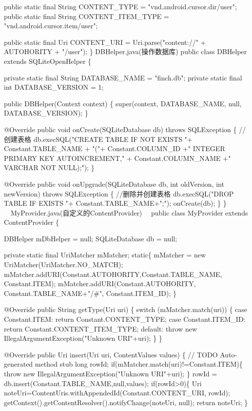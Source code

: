 \documentclass[9pt, b5paper]{article}
\begin{document}
public static final String CONTENT\_TYPE = "vnd.android.cursor.dir/user";  
public static final String CONTENT\_ITEM\_TYPE = "vnd.android.cursor.item/user";  

    public static final Uri CONTENT\_URI = Uri.parse("content://" + AUTOHORITY + "/user");  
\}  
  DBHelper.java(操作数据库)
public class DBHelper extends SQLiteOpenHelper \{  

private static final String DATABASE\_NAME = "finch.db";    
private static final int DATABASE\_VERSION = 1;    

public DBHelper(Context context) \{  
    super(context, DATABASE\_NAME, null, DATABASE\_VERSION);  
\}  

@Override  
public void onCreate(SQLiteDatabase db)  throws SQLException \{  
    //创建表格  
    db.execSQL("CREATE TABLE IF NOT EXISTS "+ Constant.TABLE\_NAME + "("+ Constant.COLUMN\_ID +" INTEGER PRIMARY KEY AUTOINCREMENT," + Constant.COLUMN\_NAME +" VARCHAR NOT NULL);");  
\}  

    @Override  
    public void onUpgrade(SQLiteDatabase db, int oldVersion, int newVersion)  throws SQLException \{  
        //删除并创建表格  
        db.execSQL("DROP TABLE IF EXISTS "+ Constant.TABLE\_NAME+";");  
        onCreate(db);  
    \}  
\}  
　MyProvider.java(自定义的ContentProvider)　
public class MyProvider extends ContentProvider \{    

DBHelper mDbHelper = null;    
SQLiteDatabase db = null;    

private static final UriMatcher mMatcher;    
static\{    
    mMatcher = new UriMatcher(UriMatcher.NO\_MATCH);    
    mMatcher.addURI(Constant.AUTOHORITY,Constant.TABLE\_NAME, Constant.ITEM);    
    mMatcher.addURI(Constant.AUTOHORITY, Constant.TABLE\_NAME+"/\#", Constant.ITEM\_ID);    
\}    


@Override    
public String getType(Uri uri) \{    
    switch (mMatcher.match(uri)) \{    
    case Constant.ITEM:    
        return Constant.CONTENT\_TYPE;    
    case Constant.ITEM\_ID:    
        return Constant.CONTENT\_ITEM\_TYPE;    
    default:    
        throw new IllegalArgumentException("Unknown URI"+uri);    
    \}    
\}    

@Override    
public Uri insert(Uri uri, ContentValues values) \{    
    // TODO Auto-generated method stub    
    long rowId;    
    if(mMatcher.match(uri)!=Constant.ITEM)\{    
        throw new IllegalArgumentException("Unknown URI"+uri);    
    \}    
    rowId = db.insert(Constant.TABLE\_NAME,null,values);    
    if(rowId>0)\{    
        Uri noteUri=ContentUris.withAppendedId(Constant.CONTENT\_URI, rowId);    
        getContext().getContentResolver().notifyChange(noteUri, null);    
        return noteUri;    
    \}    
\end{document}
